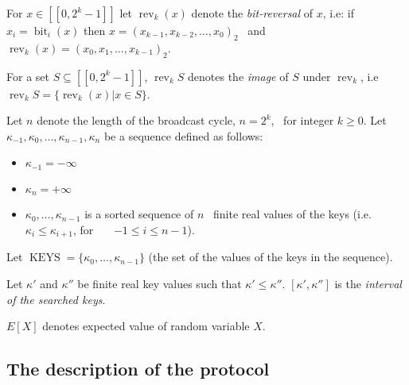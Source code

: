 \documentclass{article}
\newcommand{\tmem}[1]{{\em #1\/}}
\newcommand{\tmop}[1]{\ensuremath{\operatorname{#1}}}
\newenvironment{itemizedot}{\begin{itemize} \renewcommand{\labelitemi}{$\bullet$}\renewcommand{\labelitemii}{$\bullet$}\renewcommand{\labelitemiii}{$\bullet$}\renewcommand{\labelitemiv}{$\bullet$}}{\end{itemize}}
\begin{document}
For $x \in [[0, 2^k - 1]]$ let $\tmop{rev}_k (x)$ denote the {\em bit-reversal} of
$x$, i.e: if $x_i = \tmop{bit}_i (x)$ then $x = (x_{k - 1}, x_{k - 2}, \ldots,
x_0)_2$ \ and $\tmop{rev}_k (x) = (x_0, x_1, \ldots, x_{k - 1})_2$.

For a set $S \subseteq [[0, 2^k - 1]]$, $\tmop{rev}_k S$ denotes the
{\tmem{image}} of $S$ under $\tmop{rev}_k$, i.e $\tmop{rev}_k S
=\{\tmop{rev}_k (x) | x \in S\}$.

Let $n$ denote the length of the broadcast cycle, $n = 2^k$, \ for integer $k
\geq 0$. Let $\kappa_{- 1}, \kappa_0, \ldots, \kappa_{n - 1}, \kappa_n$ be a
sequence defined as follows:
\begin{itemizedot}
  \item $\kappa_{- 1} = - \infty$
  
  \item $\kappa_n = + \infty$
  
  \item $\kappa_0, \ldots, \kappa_{n - 1}$ is a sorted sequence of $n$ \
  finite real values of the keys (i.e. $\kappa_i \leq \kappa_{i + 1}$, for \ \
  \ $- 1 \leq i \leq n - 1$).
\end{itemizedot}
Let $\tmop{KEYS} =\{\kappa_0, \ldots, \kappa_{n - 1} \}$ (the set of the
values of the keys in the sequence).

Let $\kappa'$ and $\kappa''$ be finite real key values such that $\kappa' \leq
\kappa''$. $[\kappa', \kappa'']$ is the {\em interval of the searched keys}.

$E [X]$ denotes expected value of random variable $X$.

\subsection{The description of the protocol}
\end{document}
